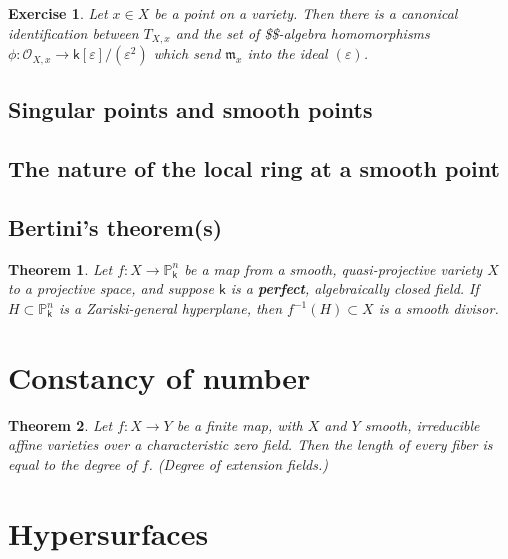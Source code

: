 \documentclass[11pt]{article}
\renewcommand{\P}{\mathbb{P}}
\renewcommand{\O}{\mathcal{O}}
\renewcommand{\k}{\mathsf{k}}
\newcommand{\fm}{\mathfrak{m}}
\renewcommand{\to}{\longrightarrow}
\renewcommand{\k}{\mathsf{k}}
\renewcommand{\P}{\mathbb P}
\renewcommand{\to}{{\longrightarrow}}
\newtheorem{theorem}{Theorem}[section]
\newtheorem{exercise}{Exercise}[section]
\begin{document}
\begin{exercise}
Let \(x \in X\) be a point on a variety. Then there is a canonical identification between \(T_{X,x}\) and the set of \$\k\$-algebra homomorphisms \(\phi : \O_{X,x} \to \k[\varepsilon]/(\varepsilon^2)\) which send \(\fm_{x}\) into the ideal \((\varepsilon)\).
\end{exercise}

\subsection{Singular points and smooth points}
\label{sec:org4b9b0d3}

\subsection{The nature of the local ring at a smooth point}
\label{sec:org82e3647}

\subsection{Bertini's theorem(s)}
\label{sec:org4e2e9b7}

\begin{theorem}
Let \(f: X \to \P^n_{\k}\) be a map from a smooth, quasi-projective variety \(X\) to a projective space, and suppose \(\k\) is a \textbf{\emph{perfect}}, algebraically closed field.  If \(H \subset \P^n_{\k}\) is a Zariski-general hyperplane, then \(f^{-1}(H) \subset X\) is a smooth divisor.
\end{theorem}




\section{Constancy of number}
\label{sec:orgf6740f7}

\begin{theorem}
Let \(f: X \to Y\) be a finite map, with \(X\) and \(Y\) smooth, irreducible affine varieties over a characteristic zero field. Then the length of every fiber is equal to the degree of \(f\). (Degree of extension fields.)
\end{theorem}



\section{Hypersurfaces}
\label{sec:org4f70767}
\end{document}
